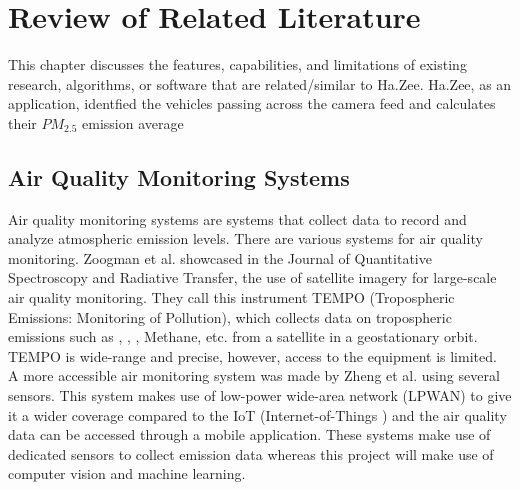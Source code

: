 \chapter{Review of Related Literature}
\label{sec:relatedlit}

This chapter discusses the features, capabilities, and limitations of existing research, algorithms, or software  that are related/similar to Ha.Zee. Ha.Zee, as an application, identfied the vehicles passing across the camera feed and calculates their $PM_{2.5}$ emission average


\begin{comment}
%
%
Guide on Writing your RRL chapter
 
1. Identify the keywords with respect to your research
      One keyword = One document section
                Examples: 2.1 Story Generation Systems
			 2.2 Knowledge Representation

2.  Find references using these keywords

3.  For each of the references that you find,
        Check: Is it relevant to your research?
        Use their references to find more relevant works.

4. Identify a set of criteria for comparison.
       It will serve as a guide to help you focus on what to look for

5. Write a summary focusing on -
       What: A short description of the work
       How: A summary of the approach it utilized
       Findings: If applicable, provide the results
        Why: Relevance to your work

6. At the end of each section,  show a Table of Comparison of the related works 
   and your proposed project/system

\end{comment}

\section{Air Quality Monitoring Systems}
Air quality monitoring systems are systems that collect data to record and analyze atmospheric emission levels. There are various systems for air quality monitoring. Zoogman et al.\citeyear{zoogman_2017} showcased in the Journal of Quantitative Spectroscopy and Radiative Transfer, the use of satellite imagery for large-scale air quality monitoring. They call this instrument TEMPO (Tropospheric Emissions: Monitoring of Pollution), which collects data on tropospheric emissions such as , , , Methane, etc. from a satellite in a geostationary orbit. TEMPO is wide-range and precise,  however, access to the equipment is limited.  A more accessible air monitoring system was made by Zheng et al. \citeyear{zheng_2016} using several sensors. This system makes use of low-power wide-area network (LPWAN) to give it a wider coverage compared to the IoT (Internet-of-Things ) and the air quality data can be accessed through a mobile application. These systems make use of dedicated sensors to collect emission data whereas this project will make use of computer vision and machine learning.


